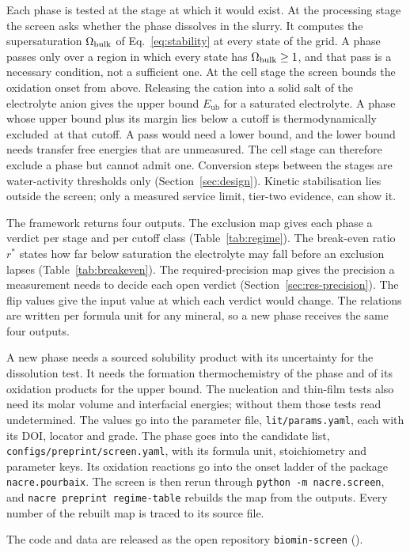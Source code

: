Each phase is tested at the stage at which it would exist. %
At the processing stage the screen asks whether the phase dissolves in the slurry. %
It computes the supersaturation $\Omega_\mathrm{bulk}$ of Eq.~\eqref{eq:stability} at every state of the grid. %
A phase passes only over a region in which every state has $\Omega_\mathrm{bulk}\ge1$, and that pass is a necessary condition, not a sufficient one. %
At the cell stage the screen bounds the oxidation onset from above. %
Releasing the cation into a solid salt of the electrolyte anion gives the upper bound $E_\mathrm{ub}$ for a saturated electrolyte. %
A phase whose upper bound plus its margin lies below a cutoff is thermodynamically excluded\nacreExcludedMark\ at that cutoff. %
A pass would need a lower bound, and the lower bound needs transfer free energies that are unmeasured. %
The cell stage can therefore exclude a phase but cannot admit one. %
Conversion steps between the stages are water-activity thresholds only (Section~\ref{sec:design}). %
Kinetic stabilisation lies outside the screen; only a measured service limit, tier-two evidence, can show it. %

The framework returns four outputs. %
The exclusion map gives each phase a verdict per stage and per cutoff class (Table~\ref{tab:regime}). %
The break-even ratio $r^*$ states how far below saturation the electrolyte may fall before an exclusion lapses (Table~\ref{tab:breakeven}). %
The required-precision map gives the precision a measurement needs to decide each open verdict (Section~\ref{sec:res-precision}). %
The flip values give the input value at which each verdict would change. %
The relations are written per formula unit for any mineral, so a new phase receives the same four outputs. %

A new phase needs a sourced solubility product with its uncertainty for the dissolution test. %
It needs the formation thermochemistry of the phase and of its oxidation products for the upper bound. %
The nucleation and thin-film tests also need its molar volume and interfacial energies; without them those tests read undetermined. %
The values go into the parameter file, \texttt{lit/params.yaml}, each with its DOI, locator and grade. %
The phase goes into the candidate list, \texttt{configs/preprint/screen.yaml}, with its formula unit, stoichiometry and parameter keys. %
Its oxidation reactions go into the onset ladder of the package \texttt{nacre.pourbaix}. %
The screen is then rerun through \texttt{python -m nacre.screen}, and \texttt{nacre preprint regime-table} rebuilds the map from the outputs. %
Every number of the rebuilt map is traced to its source file. %

The code and data are released as the open repository \texttt{biomin-screen} (\nacreRepoURL). %
